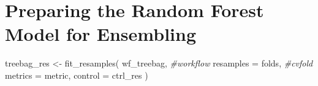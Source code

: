\documentclass[
]{article}
\newenvironment{Shaded}{\begin{snugshade}}{\end{snugshade}}
\newcommand{\AttributeTok}[1]{\textcolor[rgb]{0.77,0.63,0.00}{#1}}
\newcommand{\CommentTok}[1]{\textcolor[rgb]{0.56,0.35,0.01}{\textit{#1}}}
\newcommand{\FunctionTok}[1]{\textcolor[rgb]{0.00,0.00,0.00}{#1}}
\newcommand{\NormalTok}[1]{#1}
\newcommand{\OtherTok}[1]{\textcolor[rgb]{0.56,0.35,0.01}{#1}}
\begin{document}
\hypertarget{preparing-the-random-forest-model-for-ensembling}{%
\section{Preparing the Random Forest Model for
Ensembling}\label{preparing-the-random-forest-model-for-ensembling}}

\begin{Shaded}
\begin{Highlighting}[]
\NormalTok{treebag\_res }\OtherTok{\textless{}{-}} 
  \FunctionTok{fit\_resamples}\NormalTok{(}
\NormalTok{    wf\_treebag, }\CommentTok{\#workflow}
    \AttributeTok{resamples =}\NormalTok{ folds, }\CommentTok{\#cvfold}
    \AttributeTok{metrics =}\NormalTok{ metric,}
    \AttributeTok{control =}\NormalTok{ ctrl\_res}
\NormalTok{  )}
\end{Highlighting}
\end{Shaded}
\end{document}
